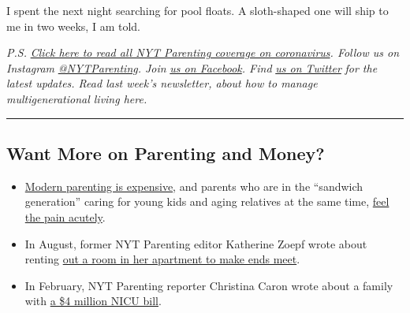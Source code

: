 I spent the next night searching for pool floats. A sloth-shaped one
will ship to me in two weeks, I am told.

\emph{P.S.}
\href{https://www.nytimes.com/spotlight/parenting-kids-coronavirus}{\emph{Click
here to read all NYT Parenting coverage on coronavirus}}\emph{. Follow
us on Instagram}
\href{https://nl.nytimes.com/f/a/KbjXDcX6H0j8UEI7pPcixg~~/AAAAAQA~/RgRfwNx_P0TIaHR0cHM6Ly93d3cuaW5zdGFncmFtLmNvbS9ueXRwYXJlbnRpbmcvP3RlPTEmbmw9bnl0LXBhcmVudGluZyZlbWM9ZWRpdF9wdGdfMjAxOTExMjc_Y2FtcGFpZ25faWQ9MTE4Jmluc3RhbmNlX2lkPTE0MTI0JnNlZ21lbnRfaWQ9MTkxMzImdXNlcl9pZD04NWJmMjRhZjE2MTk0YTlkZjgxMGQ3OTZhMzU4NmVlZCZyZWdpX2lkPTg5OTQ5NDMxMjAxOTExMjdXA255dEIKABt_V95d7BxQnFIbbWVsb255Y2UubWNhZmVlQG55dGltZXMuY29tWAQAAAAA}{\emph{@NYTParenting}}\emph{.
Join}
\href{https://nl.nytimes.com/f/a/vsa5Ga3bcTyDwVsY509i_w~~/AAAAAQA~/RgRfwNx_P0THaHR0cHM6Ly93d3cuZmFjZWJvb2suY29tL255dHBhcmVudGluZy8_dGU9MSZubD1ueXQtcGFyZW50aW5nJmVtYz1lZGl0X3B0Z18yMDE5MTEyNz9jYW1wYWlnbl9pZD0xMTgmaW5zdGFuY2VfaWQ9MTQxMjQmc2VnbWVudF9pZD0xOTEzMiZ1c2VyX2lkPTg1YmYyNGFmMTYxOTRhOWRmODEwZDc5NmEzNTg2ZWVkJnJlZ2lfaWQ9ODk5NDk0MzEyMDE5MTEyN1cDbnl0QgoAG39X3l3sHFCcUhttZWxvbnljZS5tY2FmZWVAbnl0aW1lcy5jb21YBAAAAAA~}{\emph{us
on Facebook}}\emph{. Find}
\href{https://nl.nytimes.com/f/a/swlUZzCVQVD_-CDgazvCtw~~/AAAAAQA~/RgRfwNx_P0TCaHR0cHM6Ly90d2l0dGVyLmNvbS9ueXRwYXJlbnRpbmcvP3RlPTEmbmw9bnl0LXBhcmVudGluZyZlbWM9ZWRpdF9wdGdfMjAxOTExMjc_Y2FtcGFpZ25faWQ9MTE4Jmluc3RhbmNlX2lkPTE0MTI0JnNlZ21lbnRfaWQ9MTkxMzImdXNlcl9pZD04NWJmMjRhZjE2MTk0YTlkZjgxMGQ3OTZhMzU4NmVlZCZyZWdpX2lkPTg5OTQ5NDMxMjAxOTExMjdXA255dEIKABt_V95d7BxQnFIbbWVsb255Y2UubWNhZmVlQG55dGltZXMuY29tWAQAAAAA}{\emph{us
on Twitter}} \emph{for the latest updates. Read last week's newsletter,
about how to manage multigenerational living here.}

\begin{center}\rule{0.5\linewidth}{\linethickness}\end{center}

\hypertarget{want-more-on-parenting-and-money}{%
\subsection{Want More on Parenting and
Money?}\label{want-more-on-parenting-and-money}}

\begin{itemize}
\item
  \href{https://www.nytimes.com/spotlight/price-of-modern-parenting}{Modern
  parenting is expensive}, and parents who are in the ``sandwich
  generation'' caring for young kids and aging relatives at the same
  time,
  \href{https://www.nytimes.com/2020/02/11/parenting/sandwich-generation-costs.html}{feel
  the pain acutely}.
\item
  In August, former NYT Parenting editor Katherine Zoepf wrote about
  renting
  \href{https://www.nytimes.com/2019/08/27/parenting/parents-money-stress.html}{out
  a room in her apartment to make ends meet}.
\item
  In February, NYT Parenting reporter Christina Caron wrote about a
  family with
  \href{https://www.nytimes.com/2020/02/11/parenting/nicu-costs.html}{a
  \$4 million NICU bill}.
\end{itemize}

